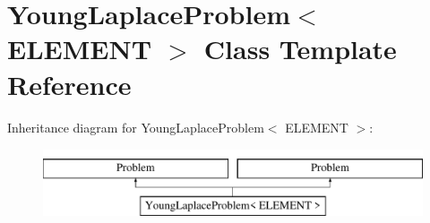 \hypertarget{classYoungLaplaceProblem}{}\section{Young\+Laplace\+Problem$<$ E\+L\+E\+M\+E\+NT $>$ Class Template Reference}
\label{classYoungLaplaceProblem}
Inheritance diagram for Young\+Laplace\+Problem$<$ E\+L\+E\+M\+E\+NT $>$\+:\begin{figure}[H]
\begin{center}
\leavevmode
\includegraphics[height=2.000000cm]{classYoungLaplaceProblem}
\end{center}
\end{figure}
